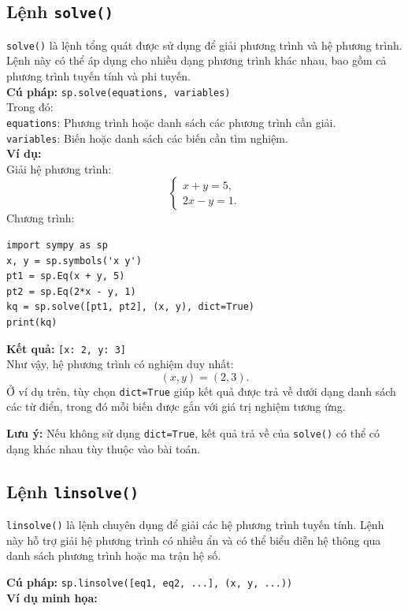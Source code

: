 \documentclass[13pt,a4paper]{article}
\begin{document}
\subsection{Lệnh \texttt{solve()}}
\texttt{solve()} là lệnh tổng quát được sử dụng để giải phương trình và hệ phương trình. Lệnh này có thể áp dụng cho nhiều dạng phương trình khác nhau, bao gồm cả phương trình tuyến tính và phi tuyến.\\
\noindent \textbf{Cú pháp:} \texttt{sp.solve(equations, variables)}\\
Trong đó:\\
\texttt{equations}: Phương trình hoặc danh sách các phương trình cần giải.\\
\texttt{variables}: Biến hoặc danh sách các biến cần tìm nghiệm.\\
\noindent\textbf{Ví dụ:}\\
Giải hệ phương trình:\\

\[
\begin{cases}
x+y=5,\\
2x-y=1.
\end{cases}
\]
Chương trình:
\begin{verbatim}
import sympy as sp
x, y = sp.symbols('x y')
pt1 = sp.Eq(x + y, 5)
pt2 = sp.Eq(2*x - y, 1)
kq = sp.solve([pt1, pt2], (x, y), dict=True)
print(kq)
\end{verbatim}
\textbf{Kết quả:}
\texttt{[{x: 2, y: 3}]}\\
Như vậy, hệ phương trình có nghiệm duy nhất:
\[
(x,y)=(2,3).
\]
Ở ví dụ trên, tùy chọn \texttt{dict=True} giúp kết quả được trả về dưới dạng danh sách các từ điển, trong đó mỗi biến được gắn với giá trị nghiệm tương ứng.

\noindent\textbf{Lưu ý:} Nếu không sử dụng \texttt{dict=True}, kết quả trả về của \texttt{solve()} có thể có dạng khác nhau tùy thuộc vào bài toán.

\subsection{Lệnh \texttt{linsolve()}}

\texttt{linsolve()} là lệnh chuyên dụng để giải các hệ phương trình tuyến tính. Lệnh này hỗ trợ giải hệ phương trình có nhiều ẩn và có thể biểu diễn hệ thông qua danh sách phương trình hoặc ma trận hệ số.

\noindent \textbf{Cú pháp:} \texttt{sp.linsolve([eq1, eq2, ...], (x, y, ...))}\\
\noindent\textbf{Ví dụ minh họa:}
\end{document}

